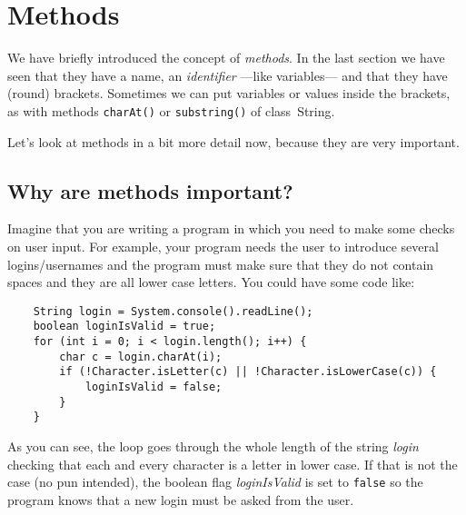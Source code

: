 
%
%
%
%
%





\section{Methods}
\label{sec:methods}

We have briefly introduced the concept of
\emph{methods}. In the last section we have seen that they have a
name, an
\emph{identifier} ---like variables--- and that they have (round)
brackets. Sometimes we can put variables or values inside the
brackets, as with methods \verb+charAt()+ or \verb+substring()+ of
class~String. 

Let's look at methods in a bit more detail now, because they are very
important. 

\subsection{Why are methods important?}

Imagine that you are writing a program in which you need to make some
checks on user input. For example, your program needs the user to
introduce several logins/usernames and the program must make sure that
they do not contain spaces and they are all lower case letters. You
could have some code like:

\begin{verbatim}
    String login = System.console().readLine();
    boolean loginIsValid = true;
    for (int i = 0; i < login.length(); i++) {
        char c = login.charAt(i);
        if (!Character.isLetter(c) || !Character.isLowerCase(c)) {
            loginIsValid = false;
        }
    }
\end{verbatim}

As you can see, the loop goes through the whole length of the string
\emph{login} checking that each and every character is a letter in
lower case. If that is not the case (no pun intended), the boolean flag
\emph{loginIsValid} is set to \verb+false+ so the program knows that a
new login must be asked from the user.

